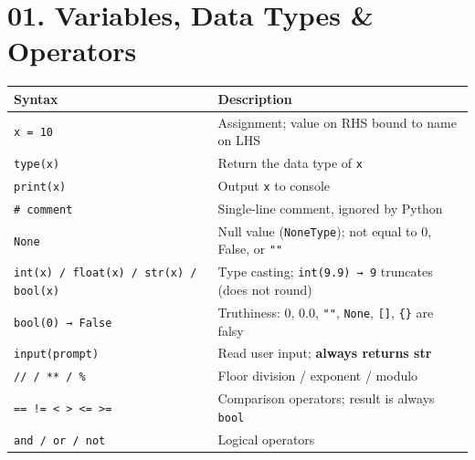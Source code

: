 \documentclass[11pt,a4paper]{report}
\let\oldtexttt\texttt
\renewcommand{\texttt}[1]{\textcolor{mainblue}{\oldtexttt{#1}}}
\begin{document}
\section*{01. Variables, Data Types \& Operators}
\small\renewcommand{\arraystretch}{1.3}
\centering
\begin{tabularx}{\textwidth}{@{}lX@{}}
\toprule
\textbf{Syntax} & \textbf{Description} \\ \midrule
\texttt{x = 10} & Assignment; value on RHS bound to name on LHS \\
\texttt{type(x)} & Return the data type of \texttt{x} \\
\texttt{print(x)} & Output \texttt{x} to console \\
\texttt{\# comment} & Single-line comment, ignored by Python \\
\texttt{None} & Null value (\texttt{NoneType}); not equal to 0, False, or \texttt{""} \\
\texttt{int(x) / float(x) / str(x) / bool(x)} & Type casting; \texttt{int(9.9) → 9} truncates (does not round) \\
\texttt{bool(0) → False} & Truthiness: 0, 0.0, \texttt{""}, \texttt{None}, \texttt{[]}, \texttt{\{\}} are falsy \\
\texttt{input(prompt)} & Read user input; \textbf{always returns str} \\
\texttt{// / ** / \%} & Floor division / exponent / modulo \\
\texttt{==  !=  <  >  <=  >=} & Comparison operators; result is always \texttt{bool} \\
\texttt{and / or / not} & Logical operators \\
\bottomrule
\end{tabularx}
\normalsize

\end{document}
